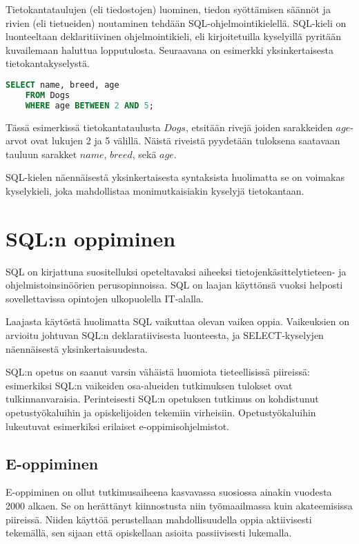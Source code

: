 \documentclass[finnish,twoside,openright]{HYgraduMLDS}
\begin{document}
Tietokantataulujen (eli tiedostojen) luominen, tiedon syöttämisen säännöt ja rivien (eli tietueiden) noutaminen tehdään SQL-ohjelmointikielellä. SQL-kieli on luonteeltaan deklaritiivinen ohjelmointikieli\cite{sadiq2004sqlator}, eli kirjoitetuilla kyselyillä pyritään kuvailemaan haluttua lopputulosta. Seuraavana on esimerkki yksinkertaisesta tietokantakyselystä.

\begin{lstlisting}[language=SQL]
    SELECT name, breed, age
    FROM Dogs
    WHERE age BETWEEN 2 AND 5;
\end{lstlisting}

Tässä esimerkissä tietokantataulusta $Dogs$, etsitään rivejä joiden sarakkeiden $age$-arvot ovat lukujen 2 ja 5 välillä. Näistä riveistä pyydetään tuloksena saatavaan tauluun sarakket $name$, $breed$, sekä $age$.

SQL-kielen näennäisestä yksinkertaisesta syntaksista huolimatta se on voimakas kyselykieli, joka mahdollistaa monimutkaisiakin kyselyjä tietokantaan.


\section{SQL:n oppiminen}

SQL on kirjattuna suositelluksi opeteltavaksi aiheeksi tietojenkäsittelytieteen-\cite{acm2013currilum} ja ohjelmistoinsinöörien\cite{swebok} perusopinnoissa. SQL on laajan käyttönsä vuoksi helposti sovellettavissa opintojen ulkopuolella IT-alalla.

Laajasta käytöstä huolimatta SQL vaikuttaa olevan vaikea oppia. Vaikeuksien on arvioitu johtuvan SQL:n deklaratiivisesta luonteesta, ja SELECT-kyselyjen näennäisestä yksinkertaisuudesta\cite{sadiq2004sqlator}.

SQL:n opetus on saanut varsin vähäistä huomiota tieteellisissä piireissä\cite{Taipalus:2019:EFS:3287324.3287359}: esimerkiksi SQL:n vaikeiden osa-alueiden tutkimuksen tulokset ovat tulkinnanvaraisia\cite{Taipalus:2019:EFS:3287324.3287359}. Perinteisesti SQL:n opetuksen tutkimus on kohdistunut opetustyökaluihin ja opiskelijoiden tekemiin virheisiin\cite{Taipalus:2019:EFS:3287324.3287359}. Opetustyökaluihin lukeutuvat esimerkiksi erilaiset e-oppimisohjelmistot.

\subsection{E-oppiminen}

E-oppiminen on ollut tutkimusaiheena kasvavassa suosiossa ainakin vuodesta 2000 alkaen. Se on herättänyt kiinnostusta niin työmaailmassa kuin akateemisissa piireissä. Niiden käyttöä perustellaan mahdollisuudella oppia aktiivisesti tekemällä, sen sijaan että opiskellaan asioita passiivisesti lukemalla\cite{Brusilovsky:2010:LSP:1656255.1656257}. 
\end{document}
